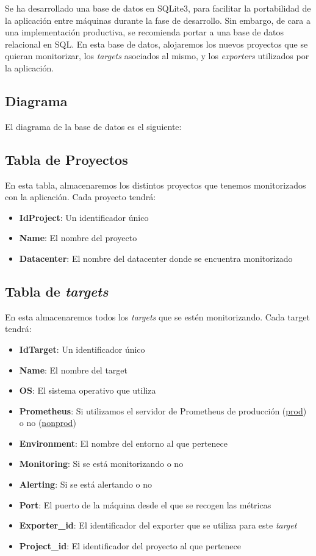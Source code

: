 Se ha desarrollado una base de datos en SQLite3\cite{sqlite}, para facilitar la portabilidad de la aplicación entre máquinas durante la fase de desarrollo. Sin embargo, de cara a una implementación productiva, se recomienda portar a una base de datos relacional en SQL.
En esta base de datos, alojaremos los nuevos proyectos que se quieran monitorizar, los \textit{targets} asociados al mismo, y los \textit{exporters} utilizados por la aplicación.

\subsection*{Diagrama}
El diagrama de la base de datos es el siguiente:


\subsection*{Tabla de Proyectos}
En esta tabla, almacenaremos los distintos proyectos que tenemos monitorizados con la aplicación. Cada proyecto tendrá:
\begin{itemize}
    \item \textbf{IdProject}: Un identificador único
    \item \textbf{Name}: El nombre del proyecto
    \item \textbf{Datacenter}: El nombre del datacenter donde se encuentra monitorizado
\end{itemize}

\subsection*{Tabla de	\textit{targets}}
En esta almacenaremos todos los \textit{targets} que se estén monitorizando. Cada target tendrá:
\begin{itemize}
    \item \textbf{IdTarget}: Un identificador único
    \item \textbf{Name}: El nombre del target
    \item \textbf{OS}: El sistema operativo que utiliza
    \item \textbf{Prometheus}: Si utilizamos el servidor de Prometheus de producción (\url{prod}) o no (\url{nonprod})
    \item \textbf{Environment}: El nombre del entorno al que pertenece
    \item \textbf{Monitoring}: Si se está monitorizando o no
    \item \textbf{Alerting}: Si se está alertando o no
    \item \textbf{Port}: El puerto de la máquina desde el que se recogen las métricas
    \item \textbf{Exporter\_id}: El identificador del exporter que se utiliza para este \textit{target}
    \item \textbf{Project\_id}: El identificador del proyecto al que pertenece
\end{itemize}

